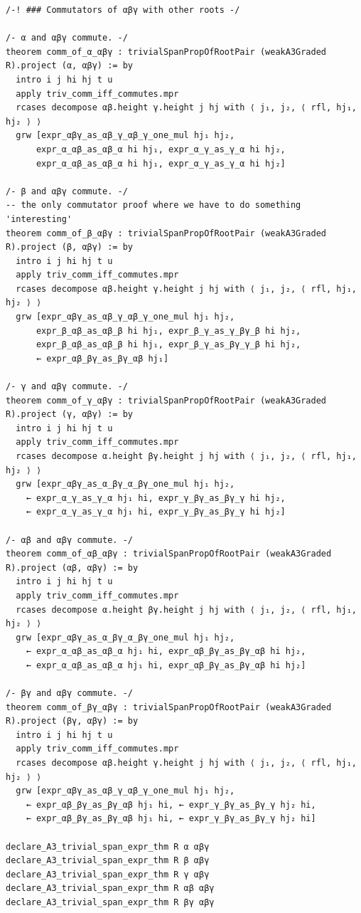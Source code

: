\begin{Verbatim}
/-! ### Commutators of αβγ with other roots -/

/- α and αβγ commute. -/
theorem comm_of_α_αβγ : trivialSpanPropOfRootPair (weakA3Graded R).project (α, αβγ) := by
  intro i j hi hj t u
  apply triv_comm_iff_commutes.mpr
  rcases decompose αβ.height γ.height j hj with ⟨ j₁, j₂, ⟨ rfl, hj₁, hj₂ ⟩ ⟩
  grw [expr_αβγ_as_αβ_γ_αβ_γ_one_mul hj₁ hj₂,
      expr_α_αβ_as_αβ_α hi hj₁, expr_α_γ_as_γ_α hi hj₂,
      expr_α_αβ_as_αβ_α hi hj₁, expr_α_γ_as_γ_α hi hj₂]

/- β and αβγ commute. -/
-- the only commutator proof where we have to do something 'interesting'
theorem comm_of_β_αβγ : trivialSpanPropOfRootPair (weakA3Graded R).project (β, αβγ) := by
  intro i j hi hj t u
  apply triv_comm_iff_commutes.mpr
  rcases decompose αβ.height γ.height j hj with ⟨ j₁, j₂, ⟨ rfl, hj₁, hj₂ ⟩ ⟩
  grw [expr_αβγ_as_αβ_γ_αβ_γ_one_mul hj₁ hj₂,
      expr_β_αβ_as_αβ_β hi hj₁, expr_β_γ_as_γ_βγ_β hi hj₂,
      expr_β_αβ_as_αβ_β hi hj₁, expr_β_γ_as_βγ_γ_β hi hj₂,
      ← expr_αβ_βγ_as_βγ_αβ hj₁]

/- γ and αβγ commute. -/
theorem comm_of_γ_αβγ : trivialSpanPropOfRootPair (weakA3Graded R).project (γ, αβγ) := by
  intro i j hi hj t u
  apply triv_comm_iff_commutes.mpr
  rcases decompose α.height βγ.height j hj with ⟨ j₁, j₂, ⟨ rfl, hj₁, hj₂ ⟩ ⟩
  grw [expr_αβγ_as_α_βγ_α_βγ_one_mul hj₁ hj₂,
    ← expr_α_γ_as_γ_α hj₁ hi, expr_γ_βγ_as_βγ_γ hi hj₂,
    ← expr_α_γ_as_γ_α hj₁ hi, expr_γ_βγ_as_βγ_γ hi hj₂]

/- αβ and αβγ commute. -/
theorem comm_of_αβ_αβγ : trivialSpanPropOfRootPair (weakA3Graded R).project (αβ, αβγ) := by
  intro i j hi hj t u
  apply triv_comm_iff_commutes.mpr
  rcases decompose α.height βγ.height j hj with ⟨ j₁, j₂, ⟨ rfl, hj₁, hj₂ ⟩ ⟩
  grw [expr_αβγ_as_α_βγ_α_βγ_one_mul hj₁ hj₂,
    ← expr_α_αβ_as_αβ_α hj₁ hi, expr_αβ_βγ_as_βγ_αβ hi hj₂,
    ← expr_α_αβ_as_αβ_α hj₁ hi, expr_αβ_βγ_as_βγ_αβ hi hj₂]

/- βγ and αβγ commute. -/
theorem comm_of_βγ_αβγ : trivialSpanPropOfRootPair (weakA3Graded R).project (βγ, αβγ) := by
  intro i j hi hj t u
  apply triv_comm_iff_commutes.mpr
  rcases decompose αβ.height γ.height j hj with ⟨ j₁, j₂, ⟨ rfl, hj₁, hj₂ ⟩ ⟩
  grw [expr_αβγ_as_αβ_γ_αβ_γ_one_mul hj₁ hj₂,
    ← expr_αβ_βγ_as_βγ_αβ hj₁ hi, ← expr_γ_βγ_as_βγ_γ hj₂ hi,
    ← expr_αβ_βγ_as_βγ_αβ hj₁ hi, ← expr_γ_βγ_as_βγ_γ hj₂ hi]

declare_A3_trivial_span_expr_thm R α αβγ
declare_A3_trivial_span_expr_thm R β αβγ
declare_A3_trivial_span_expr_thm R γ αβγ
declare_A3_trivial_span_expr_thm R αβ αβγ
declare_A3_trivial_span_expr_thm R βγ αβγ


\end{Verbatim}
